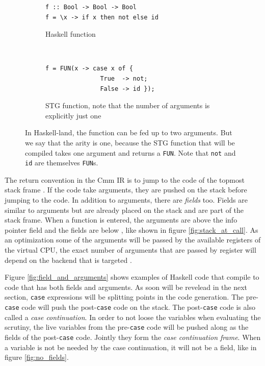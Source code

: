 \begin{figure}
\begin{mdframed}
        \begin{subfigure}[t]{0.5\textwidth}
          \begin{verbatim}
f :: Bool -> Bool -> Bool
f = \x -> if x then not else id
          \end{verbatim}
          \caption{Haskell function}
        \end{subfigure}
    ~ %
        \begin{subfigure}[t]{0.5\textwidth}
          \begin{verbatim}
f = FUN(x -> case x of {
               True  -> not;
               False -> id });
          \end{verbatim}
          \caption{STG function, note that the number of arguments is
explicitly just one}
        \end{subfigure}
  \caption{In Haskell-land, the function can be fed up to two arguments.
  But we say that the arity is one, because the STG function that will be
  compiled takes one argument and returns a \texttt{FUN}. Note that \texttt{not}
  and \texttt{id} are themselves \texttt{FUN}s.
 }
  \label{fig:tricky_arity}
\end{mdframed}
\end{figure}

The return convention in the Cmm IR is to jump to the code of the
topmost stack frame \cite{commentary_return_convention}. If the code
take arguments, they are pushed on the stack before jumping to the
code. In addition to arguments, there are \emph{fields} too. Fields are
similar to arguments but are already placed on the stack and are part of
the stack frame. When a function is entered, the arguments are above the
info pointer field and the fields are below \cite{github_stack_at_call}, like
shown in figure \ref{fig:stack_at_call}. As an optimization some of the
arguments will be passed by the available registers of the virtual CPU,
the exact number of arguments that are passed by register will depend on
the backend that is targeted \cite{github_mach_regs_h}.

Figure \ref{fig:field_and_arguments} shows examples of Haskell code
that compile to code that has both fields and arguments. As soon will
be revelead in the next section, \texttt{case} expressions will be
splitting points in the code generation. The pre-\texttt{case} code will
push the post-\texttt{case} code on the stack. The post-\texttt{case}
code is also called a \emph{case continuation}. In order to not loose
the variables when evaluating the scrutiny, the live variables from
the pre-\texttt{case} code will be pushed along as the fields of the
post-\texttt{case} code. Jointly they form the \emph{case continuation
frame}. When a variable is not be needed by the case continuation, it
will not be a field, like in figure \ref{fig:no_fields}.

